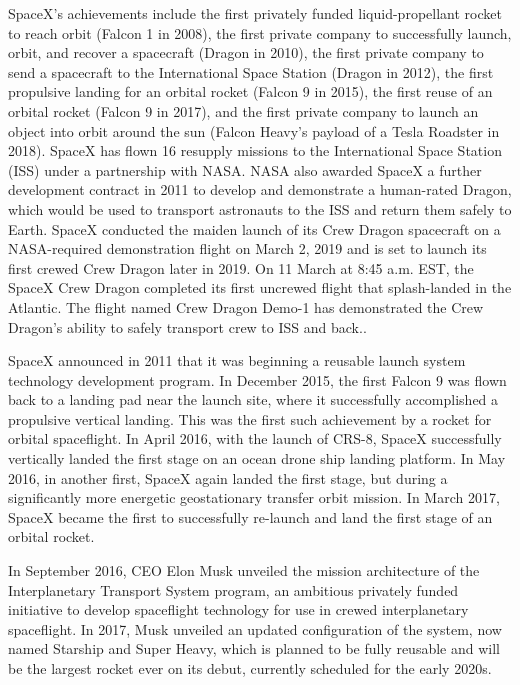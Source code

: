SpaceX's achievements include the first privately funded
liquid-propellant rocket to reach orbit (Falcon 1 in 2008), the first
private company to successfully launch, orbit, and recover a spacecraft
(Dragon in 2010), the first private company to send a spacecraft to the
International Space Station (Dragon in 2012), the first propulsive
landing for an orbital rocket (Falcon 9 in 2015), the first reuse of an
orbital rocket (Falcon 9 in 2017), and the first private company to
launch an object into orbit around the sun (Falcon Heavy's payload of a
Tesla Roadster in 2018). SpaceX has flown 16 resupply missions to the
International Space Station (ISS) under a partnership with NASA. NASA
also awarded SpaceX a further development contract in 2011 to develop
and demonstrate a human-rated Dragon, which would be used to transport
astronauts to the ISS and return them safely to Earth. SpaceX conducted
the maiden launch of its Crew Dragon spacecraft on a NASA-required
demonstration flight on March 2, 2019 and is set to launch its first
crewed Crew Dragon later in 2019. On 11 March at 8:45 a.m. EST, the
SpaceX Crew Dragon completed its first uncrewed flight that
splash-landed in the Atlantic. The flight named Crew Dragon Demo-1 has
demonstrated the Crew Dragon's ability to safely transport crew to ISS
and back..

SpaceX announced in 2011 that it was beginning a reusable launch system
technology development program. In December 2015, the first Falcon 9 was
flown back to a landing pad near the launch site, where it successfully
accomplished a propulsive vertical landing. This was the first such
achievement by a rocket for orbital spaceflight. In April 2016, with the
launch of CRS-8, SpaceX successfully vertically landed the first stage
on an ocean drone ship landing platform. In May 2016, in another first,
SpaceX again landed the first stage, but during a significantly more
energetic geostationary transfer orbit mission. In March 2017, SpaceX
became the first to successfully re-launch and land the first stage of
an orbital rocket.

In September 2016, CEO Elon Musk unveiled the mission architecture of
the Interplanetary Transport System program, an ambitious privately
funded initiative to develop spaceflight technology for use in crewed
interplanetary spaceflight. In 2017, Musk unveiled an updated
configuration of the system, now named Starship and Super Heavy, which
is planned to be fully reusable and will be the largest rocket ever on
its debut, currently scheduled for the early 2020s.

